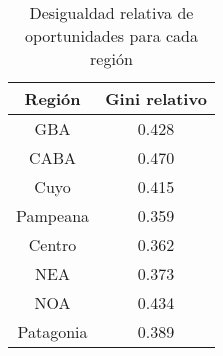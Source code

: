 \begin{table}
    \centering
    \caption{Desigualdad relativa de oportunidades para cada región}
    \begin{tabular}{cc}
    \hline
        \textbf{Región} & \textbf{Gini relativo} \\
    \hline
        GBA & 0.428 \\
        CABA & 0.470 \\
        Cuyo & 0.415 \\
        Pampeana & 0.359 \\
        Centro & 0.362 \\
        NEA & 0.373 \\
        NOA & 0.434 \\
        Patagonia & 0.389 \\
    \hline
    \end{tabular}
    \label{tab:iop-region-relativa}
\end{table}
